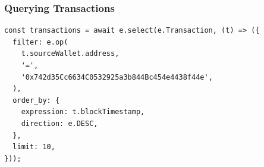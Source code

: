 \subsubsection*{Querying Transactions}
\begin{tcolorbox}[width=\textwidth, boxrule=0.5pt, colback=gray!5, colframe=gray!50]
\begin{verbatim}
const transactions = await e.select(e.Transaction, (t) => ({
  filter: e.op(
    t.sourceWallet.address,
    '=',
    '0x742d35Cc6634C0532925a3b844Bc454e4438f44e',
  ),
  order_by: {
    expression: t.blockTimestamp,
    direction: e.DESC,
  },
  limit: 10,
}));
\end{verbatim}
\end{tcolorbox}
